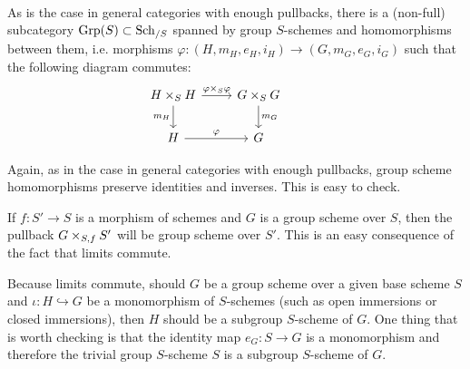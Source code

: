 \begin{definition}
$$\begin{tikzcd}
                        \end{tikzcd}
                    $$
                As is the case in general categories with enough pullbacks, there is a (non-full) subcategory $\mathrm{Grp}(S) \subset \mathrm{Sch}_{/S}$ spanned by group $S$-schemes and homomorphisms between them, i.e. morphisms $\varphi: (H, m_H, e_H, i_H) \to (G, m_G, e_G, i_G)$ such that the following diagram commutes:
                    $$
                        \begin{tikzcd}
                        	{H \x_S H} & {G \x_S G} & {} \\
                        	H & G
                        	\arrow["{m_H}"', from=1-1, to=2-1]
                        	\arrow["{m_G}", from=1-2, to=2-2]
                        	\arrow["\varphi", from=2-1, to=2-2]
                        	\arrow["{\varphi \x_S \varphi}", from=1-1, to=1-2]
                        \end{tikzcd}
                    $$
            \end{definition}
            \begin{remark}
                Again, as in the case in general categories with enough pullbacks, group scheme homomorphisms preserve identities and inverses. This is easy to check.
            \end{remark}
            \begin{remark} \label{remark: pullbacks_of_group_schemes}
                If $f: S' \to S$ is a morphism of schemes and $G$ is a group scheme over $S$, then the pullback $G \x_{S, f} S'$ will be group scheme over $S'$. This is an easy consequence of the fact that limits commute.
            \end{remark}
            \begin{remark} \label{remark: open_and_closed_subgroup_schemes}
                Because limits commute, should $G$ be a group scheme over a given base scheme $S$ and $\iota: H \hookrightarrow G$ be a monomorphism of $S$-schemes (such as open immersions or closed immersions), then $H$ should be a subgroup $S$-scheme of $G$. One thing that is worth checking is that the identity map $e_G: S \to G$ is a monomorphism and therefore the trivial group $S$-scheme $S$ is a subgroup $S$-scheme of $G$.   
            \end{remark}
